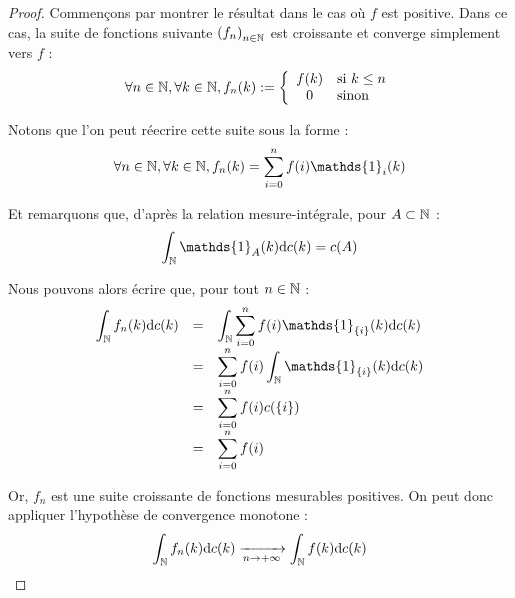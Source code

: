 \documentclass[../integ-proba.tex]{subfiles}
\begin{document}
    \begin{proof}
        Commençons par montrer le résultat dans le cas où $f$ est positive.
        Dans ce cas, la suite de fonctions suivante $\left(f_n\right)_{n\in\mathbb{N}}$ est croissante et converge simplement vers $f$ :
        \begin{displaymath}
            \forall n \in \mathbb{N}, \forall k \in \mathbb{N}, f_n(k) :=
        \left\{
            \begin{array}{cl}
                f(k) & \textnormal{si } k \leq n\\
                0    & \textnormal{sinon}
            \end{array}
        \right.
        \end{displaymath}

        Notons que l'on peut réecrire cette suite sous la forme :
        \begin{displaymath}
            \forall n \in \N, \forall k \in \N, f_n(k) = \sum_{i=0}^n f(i) \mathds{1}_{i}(k)
        \end{displaymath}

        Et remarquons que, d'après la relation mesure-intégrale, pour $A \subset \mathbb{N}$ :
        \begin{displaymath}
            \int_\N \mathds{1}_{A}(k) \text{d} c(k) = c(A)
        \end{displaymath}

        Nous pouvons alors écrire que, pour tout $n \in \mathbb{N}$ :
        \begin{displaymath}
            {
        \everymath={\displaystyle}
        \begin{array}{rcl}
            \int_\N f_n(k)\text{d}c(k) & = & \int_\N \sum_{i=0}^n f(i) \mathds{1}_{\{i\}}(k) \text{d}c(k)\\
                                               & = & \sum_{i=0}^n f(i) \int_\N \mathds{1}_{\{i\}}(k) \text{d}c(k)\\
                                               & = & \sum_{i=0}^n f(i) c(\{i\})\\
                                               & = & \sum_{i=0}^n f(i)
        \end{array}
        }
        \end{displaymath}

        Or, $f_n$ est une suite croissante de fonctions mesurables positives.
        On peut donc appliquer l'hypothèse de convergence monotone :
        \begin{displaymath}
            \int_{\mathbb{N}} f_n(k)\text{d}c(k) \xrightarrow[n \to + \infty]{} \int_{\mathbb{N}} f(k)\text{d}c(k)
        \end{displaymath}


\end{proof}
\end{document}
